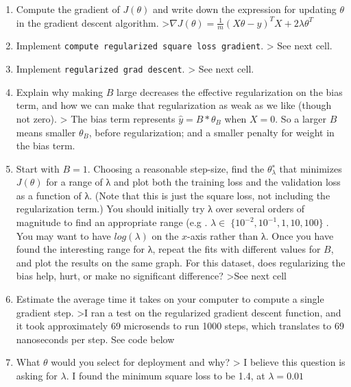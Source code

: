 \documentclass{article}
\begin{document}
\begin{enumerate}
\def\labelenumi{\arabic{enumi}.}
\item
  Compute the gradient of \(J(\theta)\) and write down the expression
  for updating \(\theta\) in the gradient descent algorithm.
  \textgreater{}\(\nabla J(\theta) = \frac{1}{m}(X\theta - y)^TX + 2\lambda \theta ^T\)
\item
  Implement \texttt{compute\ regularized\ square\ loss\ gradient}.
  \textgreater{} See next cell.
\item
  Implement \texttt{regularized\ grad\ descent}. \textgreater{} See next
  cell.
\item
  Explain why making \(B\) large decreases the effective regularization
  on the bias term, and how we can make that regularization as weak as
  we like (though not zero). \textgreater{} The bias term represents
  \(\hat{y} = B*\theta_B\) when \(X=0\). So a larger \(B\) means smaller
  \(\theta_B\), before regularization; and a smaller penalty for weight
  in the bias term.
\item
  Start with \(B = 1\). Choosing a reasonable step-size, find the
  \(\theta _\lambda^∗\) that minimizes \(J(\theta)\) for a range of λ
  and plot both the training loss and the validation loss as a function
  of λ. (Note that this is just the square loss, not including the
  regularization term.) You should initially try λ over several orders
  of magnitude to find an appropriate range (e.g .
  \(λ ∈ 􏰀\{10^{−2}, 10^{−1}, 1, 10,100\}\)􏰁. You may want to have
  \(log(λ)\) on the \(x\)-axis rather than λ. Once you have found the
  interesting range for λ, repeat the fits with different values for
  \(B\), and plot the results on the same graph. For this dataset, does
  regularizing the bias help, hurt, or make no significant difference?
  \textgreater{}See next cell
\item
  Estimate the average time it takes on your computer to compute a
  single gradient step. \textgreater{}I ran a test on the regularized
  gradient descent function, and it took approximately 69 microsends to
  run 1000 steps, which translates to 69 nanoseconds per step. See code
  below
\item
  What \(\theta\) would you select for deployment and why?
  \textgreater{} I believe this question is asking for \(\lambda\). I
  found the minimum square loss to be 1.4, at \(\lambda = 0.01\)
\end{enumerate}
\end{document}
